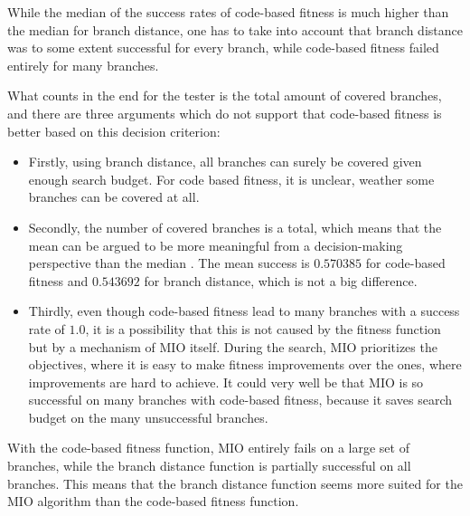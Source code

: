 While the median of the success rates of code-based fitness is much higher than the median for branch distance, one has to take into account that branch distance was to some extent successful for every branch, while code-based fitness failed entirely for many branches.

What counts in the end for the tester is the total amount of covered branches, and there are three arguments which do not support that code-based fitness is better based on this decision criterion:
\begin{itemize}
	\item Firstly, using branch distance, all branches can surely be covered given enough search budget. For code based fitness, it is unclear, weather some branches can be covered at all.
	\item Secondly, the number of covered branches is a total, which means that the mean can be argued to be more meaningful from a decision-making perspective than the median \cite{holt2009mean}. The mean success is $0.570385$ for code-based fitness and $0.543692$ for branch distance, which is not a big difference.
	\item Thirdly, even though code-based fitness lead to many branches with a success rate of $1.0$, it is a possibility that this is not caused by the fitness function but by a mechanism of MIO itself. During the search, MIO prioritizes the objectives, where it is easy to make fitness improvements over the ones, where improvements are hard to achieve. It could very well be that MIO is so successful on many branches with code-based fitness, because it saves search budget on the many unsuccessful branches.
\end{itemize}

\begin{mdframed}[style=box, frametitle={Summary RQ3:}, nobreak=true]
	With the code-based fitness function, MIO entirely fails on a large set of branches, while the branch distance function is partially successful on all branches. This means that the branch distance function seems more suited for the MIO algorithm than the code-based fitness function.
\end{mdframed}